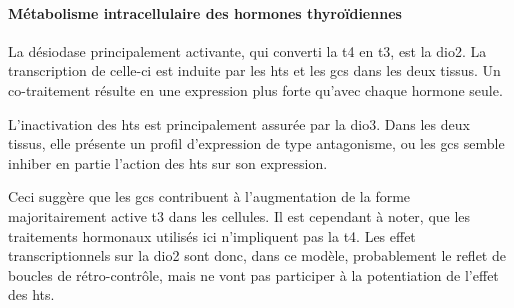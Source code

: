 \documentclass[../main.tex]{subfiles}
\begin{document}
			\paragraph{Métabolisme intracellulaire des hormones thyroïdiennes}
				La désiodase principalement activante, qui converti la \gls{t4} en \gls{t3}, est la \gls{dio2}.
				La transcription de celle-ci est induite par les \glspl{ht} et les \glspl{gc} dans les deux tissus.
				Un co-traitement résulte en une expression plus forte qu'avec chaque hormone seule.
				\par
				L'inactivation des \glspl{ht} est principalement assurée par la \gls{dio3}.
				Dans les deux tissus, elle présente un profil d'expression de type antagonisme, ou les \glspl{gc} semble inhiber en partie l'action des \glspl{ht} sur son expression.
				\par
				Ceci suggère que les \glspl{gc} contribuent à l'augmentation de la forme majoritairement active \gls{t3} dans les cellules.
				Il est cependant à noter, que les traitements hormonaux utilisés ici n'impliquent pas la \gls{t4}.
				Les effet transcriptionnels sur la \gls{dio2} sont donc, dans ce modèle, probablement le reflet de boucles de rétro-contrôle, mais ne vont pas participer à la potentiation de l'effet des \glspl{ht}.
\end{document}
